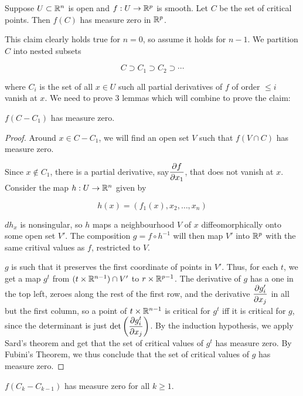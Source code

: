 \begin{theorem}
    Suppose $U \subset \mathbb{R}^n$ is open and $f: U \to \mathbb{R}^p$ is smooth. Let $C$ be the set of critical points. Then $f(C)$ has measure zero in $\mathbb{R}^p$. 
\end{theorem}

This claim clearly holds true for $n = 0$, so assume it holds for $n-1$. We partition $C$ into nested subsets 

\[C \supset C_1 \supset C_2 \supset \cdots\]

where $C_i$ is the set of all $x \in U$ such all partial derivatives of $f$ of order $\leq i$ vanish at $x$. We need to prove 3 lemmas which will combine to prove the claim:

\begin{lemma}
    $f(C - C_1)$ has measure zero.
\end{lemma}

\begin{proof}
    Around $x \in C - C_1$, we will find an open set $V$ such that $f(V \cap C)$ has measure zero. 

    Since $x \notin C_1$, there is a partial derivative, say$\dfrac{\partial f}{\partial x_1}$, that does not vanish at $x$. Consider the map $h: U \to \mathbb{R}^n$ given by 

    \[h(x) = (f_1(x),x_2,\ldots,x_n)\]

    $dh_x$ is nonsingular, so $h$ maps a neighbourhood $V$ of $x$ diffeomorphically onto some open set $V'$. The composition $g = f \circ h^{-1}$ will then map $V'$ into $\mathbb{R}^p$ with the same critival values as $f$, restricted to $V$. 
    
    $g$ is such that it preserves the first coordinate of points in $V'$. Thus, for each $t$, we get a map $g^t$ from $(t \times \mathbb{R}^{n-1}) \cap V'$ to $r \times \mathbb{R}^{p-1}$. The derivative of $g$ has a one in the top left, zeroes along the rest of the first row, and the derivative $\dfrac{\partial g_i'}{\partial x_j}$ in all but the first column, so a point of $t \times \mathbb{R}^{n-1}$ is critical for $g^t$ iff it is critical for $g$, since the determinant is just $\det\left(\dfrac{\partial g_i^t}{\partial x_j}\right)$. By the induction hypothesis, we apply Sard's theorem and get that the set of critical values of $g^t$ has measure zero. By Fubini's Theorem, we thus conclude that the set of critical values of $g$ has measure zero. 
\end{proof}

\begin{lemma}
    $f(C_k - C_{k-1})$ has measure zero for all $k \geq 1$.
\end{lemma}

